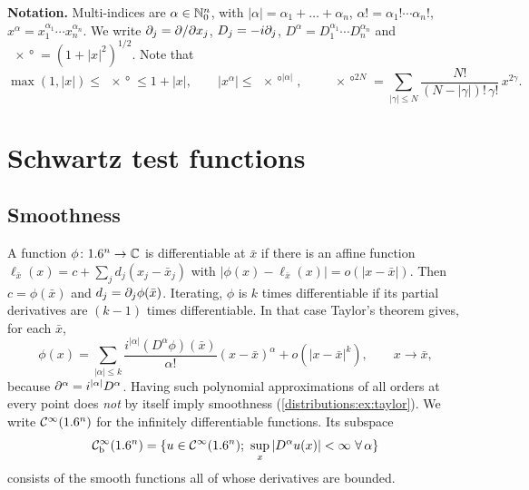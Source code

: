 \medskip\noindent\textbf{Notation.}
Multi-indices are $\alpha\in\mathbb{N}_0^n$, with $|\alpha|=\alpha_1+\dots+\alpha_n$,
$\alpha!=\alpha_1!\cdots\alpha_n!$, $x^\alpha=x_1^{\alpha_1}\cdots x_n^{\alpha_n}$. We
write $\partial_j=\partial/\partial x_j$, $D_j=-i\partial_j$, $D^\alpha=D_1^{\alpha_1}\cdots D_n^{\alpha_n}$
and $\ang{x}=(1+|x|^2)^{1/2}$. Note that
\begin{equation}\label{distributions:eq:japanese}
  \max(1,|x|)\le\ang{x}\le 1+|x|,\qquad |x^\alpha|\le\ang{x}^{|\alpha|},\qquad
  \ang{x}^{2N}=\sum_{|\gamma|\le N}\frac{N!}{(N-|\gamma|)!\,\gamma!}\,x^{2\gamma}.
\end{equation}

\section{Schwartz test functions}\label{distributions:sec:schwartz}

\subsection{Smoothness}
A function $\phi\colon1.6^n\to\mathbb{C}$ is differentiable at $\bar x$ if there is an affine
function $\ell_{\bar x}(x)=c+\sum_j d_j(x_j-\bar x_j)$ with
$|\phi(x)-\ell_{\bar x}(x)|=o(|x-\bar x|)$. Then $c=\phi(\bar x)$ and
$d_j=\partial_j\phi(\bar x)$. Iterating, $\phi$ is $k$ times differentiable if its partial
derivatives are $(k-1)$ times differentiable. In that case Taylor's theorem gives, for
each $\bar x$,
\begin{equation*}
  \phi(x)=\sum_{|\alpha|\le k}\frac{i^{|\alpha|}(D^\alpha\phi)(\bar x)}{\alpha!}(x-\bar x)^\alpha
  +o(|x-\bar x|^k),\qquad x\to\bar x,
\end{equation*}
because $\partial^\alpha=i^{|\alpha|}D^\alpha$. Having such polynomial approximations of all
orders at every point does \emph{not} by itself imply smoothness
(\cref{distributions:ex:taylor}). We write $\mathcal{C}^\infty(1.6^n)$ for the infinitely
differentiable functions. Its subspace
\[
  \mathcal{C}^\infty_{\mathrm{b}}(1.6^n)=\{u\in\mathcal{C}^\infty(1.6^n);\ \sup_x|D^\alpha u(x)|<\infty\ \forall\,\alpha\}
\]
consists of the smooth functions all of whose derivatives are bounded.


